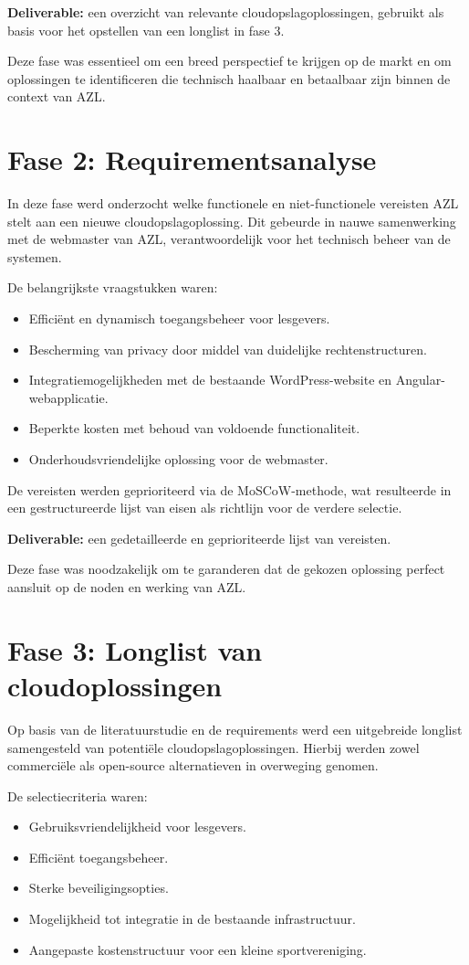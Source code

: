 \textbf{Deliverable:} een overzicht van relevante cloudopslagoplossingen, gebruikt als basis voor het opstellen van een longlist in fase 3.

Deze fase was essentieel om een breed perspectief te krijgen op de markt en om oplossingen te identificeren die technisch haalbaar en betaalbaar zijn binnen de context van AZL.

\section{Fase 2: Requirementsanalyse}
In deze fase werd onderzocht welke functionele en niet-functionele vereisten AZL stelt aan een nieuwe cloudopslagoplossing. Dit gebeurde in nauwe samenwerking met de webmaster van AZL, verantwoordelijk voor het technisch beheer van de systemen.

De belangrijkste vraagstukken waren:
\begin{itemize}
    \item Efficiënt en dynamisch toegangsbeheer voor lesgevers.
    \item Bescherming van privacy door middel van duidelijke rechtenstructuren.
    \item Integratiemogelijkheden met de bestaande WordPress-website en Angular-webapplicatie.
    \item Beperkte kosten met behoud van voldoende functionaliteit.
    \item Onderhoudsvriendelijke oplossing voor de webmaster.
\end{itemize}

De vereisten werden geprioriteerd via de MoSCoW-methode, wat resulteerde in een gestructureerde lijst van eisen als richtlijn voor de verdere selectie.

\textbf{Deliverable:} een gedetailleerde en geprioriteerde lijst van vereisten.

Deze fase was noodzakelijk om te garanderen dat de gekozen oplossing perfect aansluit op de noden en werking van AZL.

\section{Fase 3: Longlist van cloudoplossingen}
Op basis van de literatuurstudie en de requirements werd een uitgebreide longlist samengesteld van potentiële cloudopslagoplossingen. Hierbij werden zowel commerciële als open-source alternatieven in overweging genomen.

De selectiecriteria waren:
\begin{itemize}
    \item Gebruiksvriendelijkheid voor lesgevers.
    \item Efficiënt toegangsbeheer.
    \item Sterke beveiligingsopties.
    \item Mogelijkheid tot integratie in de bestaande infrastructuur.
    \item Aangepaste kostenstructuur voor een kleine sportvereniging.
\end{itemize}

